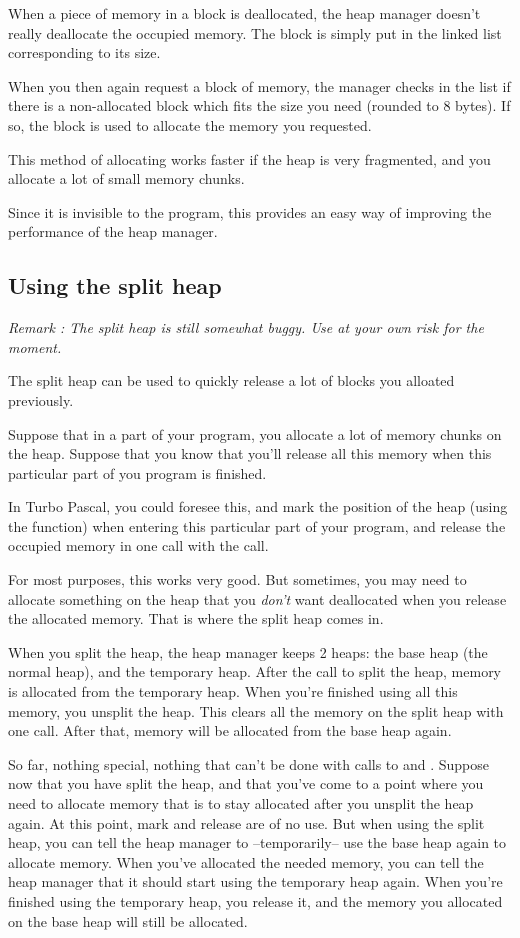 \documentclass{report}
\begin{document}
When a piece of memory in a block is deallocated, the heap manager doesn't 
really deallocate the occupied memory. The block is simply put in the linked
list corresponding to its size. 

When you then again request a block of memory, the manager checks in the
list if there is a non-allocated block which fits the size you need (rounded
to 8 bytes). If so, the block is used to allocate the memory you requested. 

This method of allocating works faster if the heap is very fragmented, and
you allocate a lot of small memory chunks.

Since it is invisible to the program, this provides an easy way of improving
the performance of the heap manager.

\subsection{Using the split heap}
{\em Remark : The split heap is still somewhat buggy. Use at your own risk
for the moment.}

The split heap can be used to quickly release a lot of blocks you alloated
previously.

Suppose that in a part of your program, you allocate a lot of memory chunks
on the heap. Suppose that you know that you'll release all this memory when
this particular part of you program is finished.

In Turbo Pascal, you could foresee this, and mark the position of the heap
(using the  function) when entering this particular part of your 
program, and release the occupied memory in one call with the 
call.

For most purposes, this works very good. But sometimes, you may need to
allocate something on the heap that you {\em don't} want deallocated when you
release the allocated memory. That is where the split heap comes in. 

When you split the heap, the heap manager keeps 2 heaps: the base heap (the
normal heap), and the temporary heap. After the call to split the heap,
memory is allocated from the temporary heap. When you're finished using all
this memory, you unsplit the heap. This clears all the memory on the split
heap with one call. After that, memory will be allocated from the base heap
again. 

So far, nothing special, nothing that can't be done with calls to 
and . Suppose now that you have split the heap, and that you've
come to a point where you need to allocate memory that is to stay allocated
after you unsplit the heap again. At this point, mark and release are of no
use. But when using the split heap, you can tell the heap manager to 
--temporarily-- use the base heap again to allocate memory. 
When you've allocated the needed memory, you can tell the heap manager that
it should start using the temporary heap again.
When you're finished using the temporary heap, you release it, and the
memory you allocated on the base heap will still be allocated.
 
\end{document}
